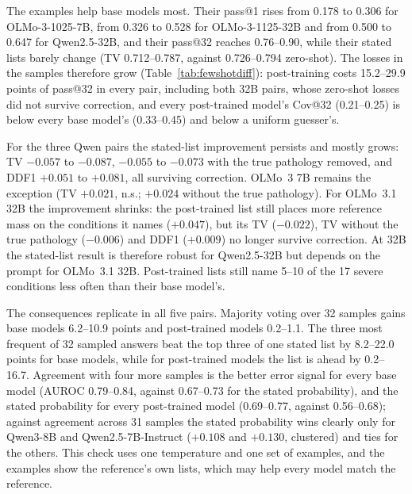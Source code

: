 \documentclass[wcp]{jmlr}
\begin{document}
The examples help base models most. Their pass@1 rises from 0.178 to 0.306 for OLMo-3-1025-7B, from 0.326 to 0.528 for OLMo-3-1125-32B and from 0.500 to 0.647 for Qwen2.5-32B, and their pass@32 reaches 0.76--0.90, while their stated lists barely change (TV 0.712--0.787, against 0.726--0.794 zero-shot). The losses in the samples therefore grow (Table~\ref{tab:fewshotdiff}): post-training costs 15.2--29.9 points of pass@32 in every pair, including both 32B pairs, whose zero-shot losses did not survive correction, and every post-trained model's Cov@32 (0.21--0.25) is below every base model's (0.33--0.45) and below a uniform guesser's.

For the three Qwen pairs the stated-list improvement persists and mostly grows: TV $-0.057$ to $-0.087$, $-0.055$ to $-0.073$ with the true pathology removed, and DDF1 $+0.051$ to $+0.081$, all surviving correction. OLMo~3 7B remains the exception (TV $+0.021$, n.s.; $+0.024$ without the true pathology). For OLMo~3.1 32B the improvement shrinks: the post-trained list still places more reference mass on the conditions it names ($+0.047$), but its TV ($-0.022$), TV without the true pathology ($-0.006$) and DDF1 ($+0.009$) no longer survive correction. At 32B the stated-list result is therefore robust for Qwen2.5-32B but depends on the prompt for OLMo~3.1 32B. Post-trained lists still name 5--10 of the 17 severe conditions less often than their base model's.

The consequences replicate in all five pairs. Majority voting over 32 samples gains base models 6.2--10.9 points and post-trained models 0.2--1.1. The three most frequent of 32 sampled answers beat the top three of one stated list by 8.2--22.0 points for base models, while for post-trained models the list is ahead by 0.2--16.7. Agreement with four more samples is the better error signal for every base model (AUROC 0.79--0.84, against 0.67--0.73 for the stated probability), and the stated probability for every post-trained model (0.69--0.77, against 0.56--0.68); against agreement across 31 samples the stated probability wins clearly only for Qwen3-8B and Qwen2.5-7B-Instruct ($+0.108$ and $+0.130$, clustered) and ties for the others.
This check uses one temperature and one set of examples, and the examples show the reference's own lists, which may help every model match the reference.
\end{document}
